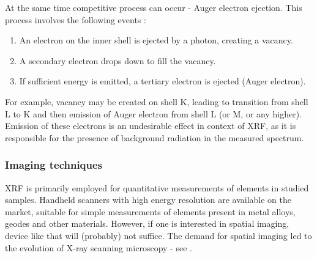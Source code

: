 At the same time competitive process can occur - Auger electron ejection. This process involves the following events \cite{augerElectron}:
\begin{enumerate}
    \item An electron on the inner shell is ejected by a photon, creating a vacancy.
    \item A secondary electron drops down to fill the vacancy.
    \item If sufficient energy is emitted, a tertiary electron is ejected (Auger electron).
\end{enumerate}
For example, vacancy may be created on shell K, leading to transition from shell L to K and then emission of Auger electron from shell L (or M, or any higher).
Emission of these electrons is an undesirable effect in context of XRF, as it is responsible for the presence of background radiation in the measured spectrum.

\subsubsection{Imaging techniques}
XRF is primarily employed for quantitative measurements of elements in studied samples. 
Handheld scanners with high energy resolution are available on the market, suitable for simple measurements of elements present in metal alloys, geodes and other materials. 
However, if one is interested in spatial imaging, device like that will (probably) not suffice. 
The demand for spatial imaging led to the evolution of X-ray scanning microscopy - see .

